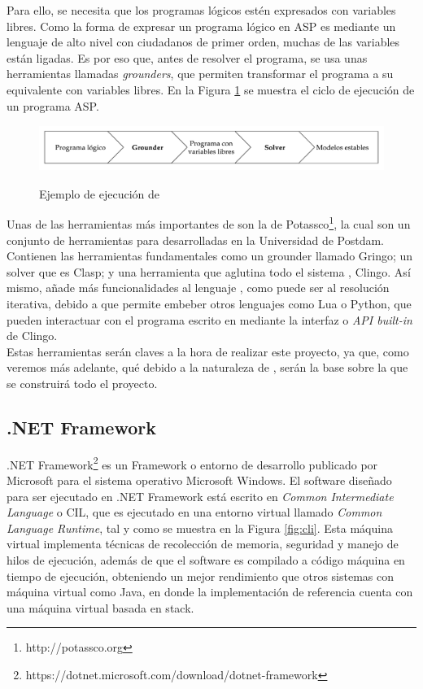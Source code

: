 Para ello, se necesita que los programas lógicos estén expresados con variables libres. Como la forma de expresar un programa lógico en ASP es mediante un lenguaje de alto nivel con ciudadanos de primer orden, muchas de las variables están ligadas. Es por eso que, antes de resolver el programa, se usa unas herramientas llamadas \textit{grounders}, que permiten transformar el programa a su equivalente con variables libres. En la Figura \ref{fig:asp} se muestra el ciclo de ejecución de un programa ASP. \\

\begin{figure}[h]
	\centering
	\includegraphics[height=4em]{images/ejecucion-asp}
	\label{fig:asp}
	\caption{Ejemplo de ejecución de \asp}
\end{figure}

Unas de las herramientas más importantes de \asp son la de Potassco\footnote{http://potassco.org}, la cual son un conjunto de herramientas para \asp desarrolladas en la Universidad de Postdam. Contienen las herramientas fundamentales como un grounder llamado Gringo; un solver que es Clasp; y una herramienta que aglutina todo el sistema \asp, Clingo. Así mismo, añade más funcionalidades al lenguaje \asp, como puede ser al resolución iterativa, debido a que permite embeber otros lenguajes como Lua o Python, que pueden interactuar con el programa escrito en \asp mediante la interfaz o \textit{API built-in} de Clingo. \\

Estas herramientas serán claves a la hora de realizar este proyecto, ya que, como veremos más adelante, qué debido a la naturaleza de \asp, serán la base sobre la que se construirá todo el proyecto.

\subsection{.NET Framework}

.NET Framework\footnote{https://dotnet.microsoft.com/download/dotnet-framework} es un Framework o entorno de desarrollo publicado por Microsoft para el sistema operativo Microsoft Windows. El software diseñado para ser ejecutado en .NET Framework está escrito en \textit{Common Intermediate Language} o CIL, que es ejecutado en una entorno virtual llamado \textit{Common Language Runtime}, tal y como se muestra en la Figura \ref{fig:cli}. Esta máquina virtual implementa técnicas de recolección de memoria, seguridad y manejo de hilos de ejecución, además de que el software es compilado a código máquina en tiempo de ejecución, obteniendo un mejor rendimiento que otros sistemas con máquina virtual como Java, en donde la implementación de referencia cuenta con una máquina virtual basada en stack. \\

